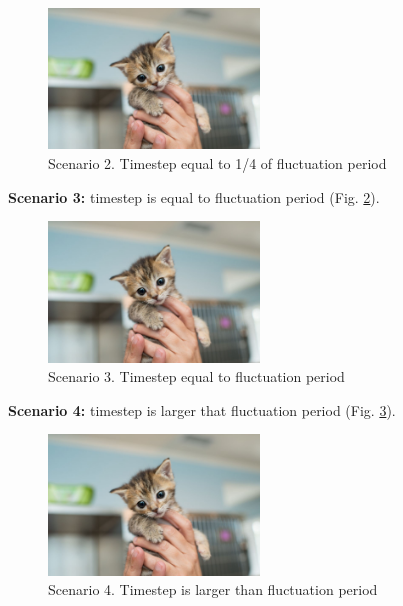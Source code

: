 \begin{figure}[h!]
\centering %
\includegraphics[width=0.5\textwidth]{Pictures/kitten-placeholder.jpg}
\caption{Scenario 2. Timestep equal to 1/4 of fluctuation period}
\label{time2}
\end{figure}

\textbf{Scenario 3:} timestep is equal to fluctuation period (Fig. \ref{time3}).

\begin{figure}[h!]
\centering %
\includegraphics[width=0.5\textwidth]{Pictures/kitten-placeholder.jpg}
\caption{Scenario 3. Timestep equal to fluctuation period}
\label{time3}
\end{figure}

\textbf{Scenario 4:} timestep is larger that fluctuation period (Fig. \ref{time4}).

\begin{figure}[h!]
\centering %
\includegraphics[width=0.5\textwidth]{Pictures/kitten-placeholder.jpg}
\caption{Scenario 4. Timestep is larger than fluctuation period}
\label{time4}
\end{figure}

